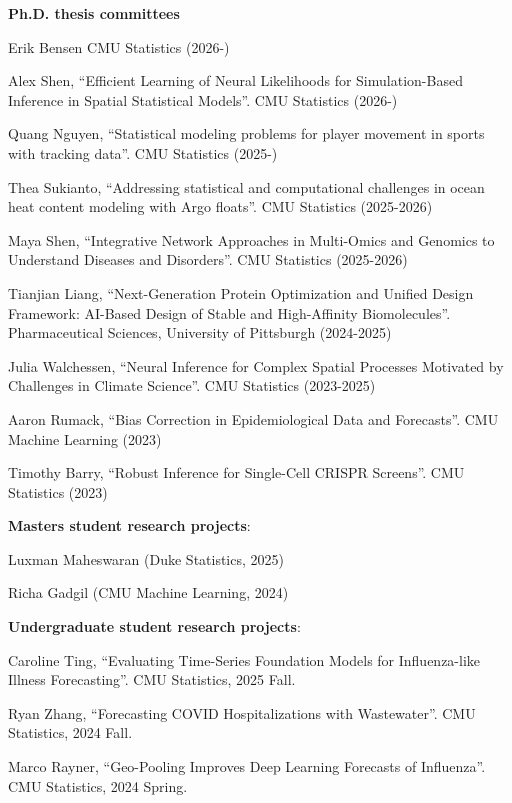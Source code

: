 \documentclass[10pt]{article}
\begin{document}
\textbf{Ph.D. thesis committees}
\begin{enumerate}[label= {[\arabic*]}]
\item Erik Bensen CMU Statistics (2026-)
\item Alex Shen, ``Efficient Learning of Neural Likelihoods for Simulation-Based Inference in Spatial Statistical Models''. CMU Statistics (2026-)
\item Quang Nguyen, ``Statistical modeling problems for player movement in sports with tracking data''. CMU Statistics (2025-)
\item Thea Sukianto, ``Addressing statistical and computational challenges in ocean heat content modeling with Argo floats''. CMU Statistics (2025-2026)
\item Maya Shen, ``Integrative Network Approaches in Multi-Omics and Genomics to Understand Diseases and Disorders''. CMU Statistics (2025-2026)
\item Tianjian Liang, ``Next-Generation Protein Optimization and Unified Design Framework: AI-Based Design of Stable and High-Affinity Biomolecules''. Pharmaceutical Sciences, University of Pittsburgh (2024-2025)
\item Julia Walchessen, ``Neural Inference for Complex Spatial Processes Motivated by Challenges in Climate Science''. CMU Statistics (2023-2025)
\item Aaron Rumack, ``Bias Correction in Epidemiological Data and Forecasts''. \newline CMU Machine Learning (2023)
\item Timothy Barry, ``Robust Inference for Single-Cell CRISPR Screens''. CMU Statistics (2023)
\end{enumerate}

\textbf{Masters student research projects}: 
\begin{enumerate}[label={[\arabic*]}]
\item Luxman Maheswaran (Duke Statistics, 2025)
\item Richa Gadgil (CMU Machine Learning, 2024)
\end{enumerate}

\textbf{Undergraduate student research projects}: 
\begin{enumerate}[label={[\arabic*]}]
\item Caroline Ting, ``Evaluating Time-Series Foundation Models for Influenza-like Illness Forecasting''. CMU Statistics, 2025 Fall.
\item Ryan Zhang, ``Forecasting COVID Hospitalizations with Wastewater''. CMU Statistics, 2024 Fall.
\item Marco Rayner, ``Geo-Pooling Improves Deep Learning Forecasts of Influenza''. CMU Statistics, 2024 Spring.
\end{enumerate}
\end{document}
